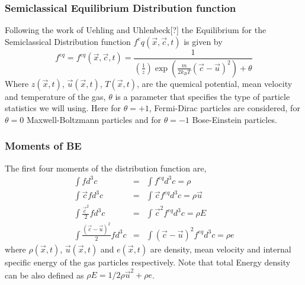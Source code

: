 \documentclass[11pt,fleqn]{beamer}
\begin{document}
\begin{frame}
	\frametitle{Semiclassical Equilibrium Distribution function}
	Following the work of Uehling and Uhlenbeck[?] the Equilibrium for the Semiclassical Distribution function $f^eq(\vec{x},\vec{c},t)$ is given by
	\begin{equation}
	f^{eq}=f^{eq}(\vec{x},\vec{c},t)=\frac{1}{(\frac{1}{z})\exp\left({\frac{m}{2 k_B T}(\vec{c}-\vec{u})^2}\right)+\theta}
	\end{equation}
	Where $z(\vec{x},t)$, $\vec{u}(\vec{x},t)$, $T(\vec{x},t)$, are the quemical potential, mean velocity and temperature of the gas, $\theta$ is a parameter that specifies the type of particle statistics we will using. Here for $\theta = +1$, Fermi-Dirac particles are considered, for $\theta = 0$ Maxwell-Boltzmann particles and for $\theta = -1$  Bose-Einstein particles. 

\end{frame}
	
\begin{frame}
	\frametitle{Moments of BE}
	The first four moments of the distribution function are,
	\begin{eqnarray}
	\int f d^3 c  &=& \int f^{eq}d^3c = \rho \\
	\int \vec{c} f d^3 c  &=& \int \vec{c} f^{eq}d^3c = \rho \vec{u} \\
	\int \frac{\vec{c}^2}{2} f d^3 c  &=& \int \vec{c}^2 f^{eq}d^3c = \rho E \\
	\int \frac{(\vec{c}-\vec{u})^2}{2} f d^3 c  &=& \int (\vec{c}-\vec{u})^2 f^{eq}d^3c = \rho e 
	\end{eqnarray}
	where $\rho(\vec{x},t)$,  $\vec{u}(\vec{x},t)$ and $e(\vec{x},t)$ are density, mean velocity and internal specific energy of the gas particles respectively. Note that total Energy density can be also defined as $\rho E = 1/2 \rho \vec{u}^2 + \rho e$.
\end{frame}
\end{document}
